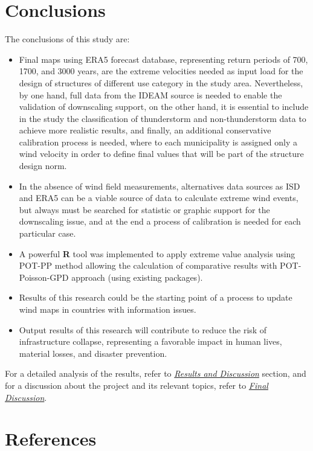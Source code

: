 \documentclass[12pt,oneside]{reedthesis}
\begin{document}
\hypertarget{conclusions}{%
\chapter{Conclusions}\label{conclusions}}

The conclusions of this study are:
\begin{itemize}
\item
  Final maps using ERA5 forecast database, representing return periods of 700, 1700, and 3000 years, are the extreme velocities needed as input load for the design of structures of different use category in the study area. Nevertheless, by one hand, full data from the IDEAM source is needed to enable the validation of downscaling support, on the other hand, it is essential to include in the study the classification of thunderstorm and non-thunderstorm data to achieve more realistic results, and finally, an additional conservative calibration process is needed, where to each municipality is assigned only a wind velocity in order to define final values that will be part of the structure design norm.
\item
  In the absence of wind field measurements, alternatives data sources as ISD and ERA5 can be a viable source of data to calculate extreme wind events, but always must be searched for statistic or graphic support for the downscaling issue, and at the end a process of calibration is needed for each particular case.
\item
  A powerful \textbf{R} tool was implemented to apply extreme value analysis using POT-PP method allowing the calculation of comparative results with POT-Poisson-GPD approach (using existing packages).
\item
  Results of this research could be the starting point of a process to update wind maps in countries with information issues.
\item
  Output results of this research will contribute to reduce the risk of infrastructure collapse, representing a favorable impact in human lives, material losses, and disaster prevention.
\end{itemize}
For a detailed analysis of the results, refer to \emph{\protect\hyperlink{rmd-results}{Results and Discussion}} section, and for a discussion about the project and its relevant topics, refer to \emph{\protect\hyperlink{fd}{Final Discussion}}.

\hypertarget{references}{%
\chapter*{References}\label{references}}
\end{document}
